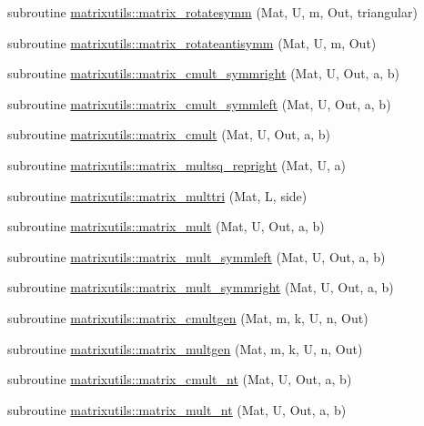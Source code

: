 \begin{DoxyCompactItemize}
\item 
subroutine \mbox{\hyperlink{namespacematrixutils_aec8c0f5500ce3fccc5a427276bbc95d2}{matrixutils\+::matrix\+\_\+rotatesymm}} (Mat, U, m, Out, triangular)
\item 
subroutine \mbox{\hyperlink{namespacematrixutils_a6e5b7eb3ff08d14994be069ca192ea48}{matrixutils\+::matrix\+\_\+rotateantisymm}} (Mat, U, m, Out)
\item 
subroutine \mbox{\hyperlink{namespacematrixutils_a2098ca04f94da631caf2ebcce5ad7bf9}{matrixutils\+::matrix\+\_\+cmult\+\_\+symmright}} (Mat, U, Out, a, b)
\item 
subroutine \mbox{\hyperlink{namespacematrixutils_a4389445ac98a45384153fff75a6a21af}{matrixutils\+::matrix\+\_\+cmult\+\_\+symmleft}} (Mat, U, Out, a, b)
\item 
subroutine \mbox{\hyperlink{namespacematrixutils_a623ed13db8bf49d73e233e3668d3923c}{matrixutils\+::matrix\+\_\+cmult}} (Mat, U, Out, a, b)
\item 
subroutine \mbox{\hyperlink{namespacematrixutils_a061be118f549334b7196808f5ce55245}{matrixutils\+::matrix\+\_\+multsq\+\_\+repright}} (Mat, U, a)
\item 
subroutine \mbox{\hyperlink{namespacematrixutils_a5db9de44653dcfa367228c2b5a077b14}{matrixutils\+::matrix\+\_\+multtri}} (Mat, L, side)
\item 
subroutine \mbox{\hyperlink{namespacematrixutils_aa6a8ab9e79a8dd522f5375ebf4a50372}{matrixutils\+::matrix\+\_\+mult}} (Mat, U, Out, a, b)
\item 
subroutine \mbox{\hyperlink{namespacematrixutils_ab4f1087b56f3198b3d84c8ebf1cdd580}{matrixutils\+::matrix\+\_\+mult\+\_\+symmleft}} (Mat, U, Out, a, b)
\item 
subroutine \mbox{\hyperlink{namespacematrixutils_a97a6a772baa3485aaddba50623e50673}{matrixutils\+::matrix\+\_\+mult\+\_\+symmright}} (Mat, U, Out, a, b)
\item 
subroutine \mbox{\hyperlink{namespacematrixutils_af451dede0e0f43908b5f8fdbd6b64717}{matrixutils\+::matrix\+\_\+cmultgen}} (Mat, m, k, U, n, Out)
\item 
subroutine \mbox{\hyperlink{namespacematrixutils_a6efcf6a348628fcb3694cb23761b52ec}{matrixutils\+::matrix\+\_\+multgen}} (Mat, m, k, U, n, Out)
\item 
subroutine \mbox{\hyperlink{namespacematrixutils_afdb73dd3fe4ce57e9ba27e6d3d511376}{matrixutils\+::matrix\+\_\+cmult\+\_\+nt}} (Mat, U, Out, a, b)
\item 
subroutine \mbox{\hyperlink{namespacematrixutils_a4a084a8c031469076ac26bf4e9055109}{matrixutils\+::matrix\+\_\+mult\+\_\+nt}} (Mat, U, Out, a, b)

\end{DoxyCompactItemize}
